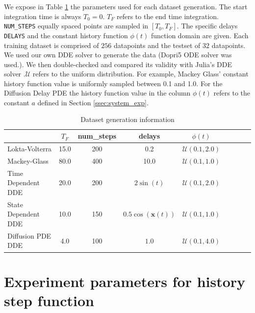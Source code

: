 We expose in Table \ref{hyper_dataset} the parameters used for each dataset generation. The start integration time is always $T_0=0$. $T_F$ refers to the end time integration. \verb?NUM_STEPS? equally spaced points are sampled in $[T_0, T_F]$. The specific delays \verb?DELAYS? and the constant history function $\phi(t)$ function domain are given. Each training dataset is comprised of $256$ datapoints and the testset of $32$ datapoints. We used our own DDE solver to generate the data (Dopri5 ODE solver \citep{dormand} was used.). We then double-checked and compared its validity with Julia’s DDE solver .$\mathcal{U}$ refers to the uniform distribution. For example, Mackey Glass’ constant history function value is uniformly sampled between 0.1 and 1.0. For the Diffusion Delay PDE the history function value in the column $\phi(t)$ refers to the constant $a$ defined in Section \ref{ssec:system_exp}.

\begin{table}[H]
\vskip 0.15in
\begin{center}
\begin{small}
\begin{sc}
\begin{tabular}{l|cccccccr}
&$T_F$ & num\_steps & delays &  $\phi(t)$\\
\hline
Lokta-Volterra & 15.0 & 200 & 0.2   & $\mathcal{U}(0.1, 2.0)$\\
Mackey-Glass & 80.0 & 400 & 10.0    & $\mathcal{U}(0.1, 1.0)$\\
Time Dependent DDE &  20.0 & 200 & $2\sin(t)$  & $\mathcal{U}(0.1, 2.0)$\\
State Dependent DDE &  10.0 & 150& $0.5 \cos(\mathbf{x}(t))$ & $\mathcal{U}(0.1, 1.0)$\\
Diffusion PDE DDE &  4.0 & 100& $1.0$ & $\mathcal{U}(0.1, 4.0)$\\
\hline
\end{tabular}
\end{sc}
\end{small}
\end{center}
\caption{Dataset generation information}
\label{hyper_dataset}
\end{table}


\section{Experiment parameters for history step function} 
\label{ap:step_history_function}
\label{sss:history_function}

